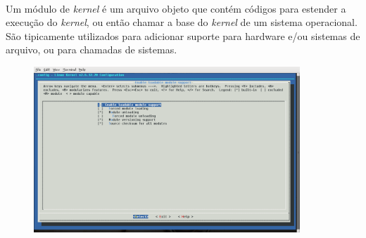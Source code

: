 \documentclass[a4paper,10pt]{article}
\begin{document}
    \paragraph{}
    Um módulo de \emph{kernel} é um arquivo objeto que contém códigos para estender a execução do \emph{kernel}, ou então chamar a
    base do \emph{kernel} de um sistema operacional. São tipicamente utilizados para adicionar suporte para hardware e/ou sistemas de 
    arquivo, ou para chamadas de sistemas.
      \begin{figure}[ht]
	\center
	\includegraphics[width=10cm]{images/EnableLoadableModuleSupport.png}
      \end{figure}
\end{document}
